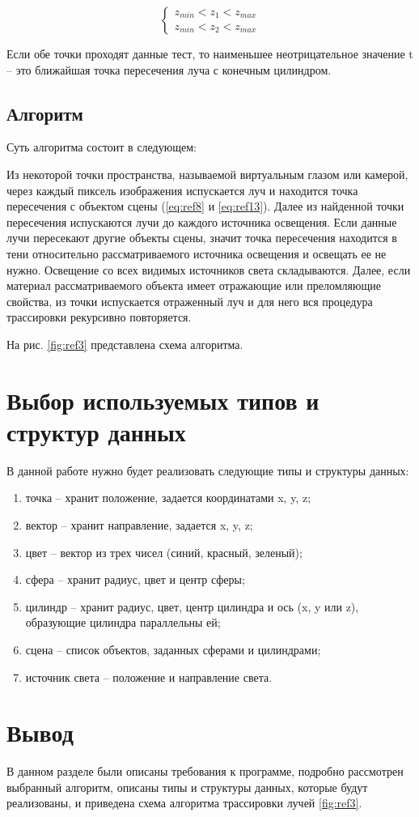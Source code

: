 \begin{equation}
	{\begin{cases}
			z_{min} < z_1 < z_{max} \\
			z_{min} < z_2 < z_{max}
			\label{eq:ref15}
		\end{cases}}
\end{equation}

Если обе точки проходят данные тест, то наименьшее неотрицательное
значение t -- это ближайшая точка пересечения луча с конечным цилиндром.

\subsection {Алгоритм}

Суть алгоритма состоит в следующем:

Из некоторой точки пространства, называемой виртуальным глазом или камерой,
через каждый пиксель изображения испускается луч и находится
точка пересечения с объектом сцены (\ref{eq:ref8} и \ref{eq:ref13}).
Далее из найденной точки пересечения испускаются лучи до каждого источника освещения.
Если данные лучи пересекают другие объекты сцены, значит точка пересечения находится
в тени относительно рассматриваемого источника освещения и освещать ее не нужно.
Освещение со всех видимых источников света складываются.
Далее, если материал рассматриваемого объекта имеет отражающие или преломляющие свойства, из точки
испускается отраженный луч и для него вся процедура трассировки рекурсивно повторяется.

На рис. \ref{fig:ref3} представлена схема алгоритма.

\begin{figure}[ht!]
\end{figure}

\section{Выбор используемых типов и структур данных}

В данной работе нужно будет реализовать следующие типы и структуры данных:

\begin{enumerate}
	\item точка -- хранит положение, задается координатами x, y, z;
	\item вектор -- хранит направление, задается x, y, z;
	\item цвет -- вектор из трех чисел (синий, красный, зеленый);
	\item сфера -- хранит радиус, цвет и центр сферы;
	\item цилиндр -- хранит радиус, цвет, центр цилиндра и ось (x, y или z), образующие цилиндра параллельны ей;
	\item сцена -- список объектов, заданных сферами и цилиндрами;
	\item источник света -- положение и направление света.
\end{enumerate}

\section{Вывод}

В данном разделе были описаны требования к программе, подробно рассмотрен выбранный алгоритм,
описаны типы и структуры данных, которые будут реализованы,
и приведена схема алгоритма трассировки лучей \ref{fig:ref3}.